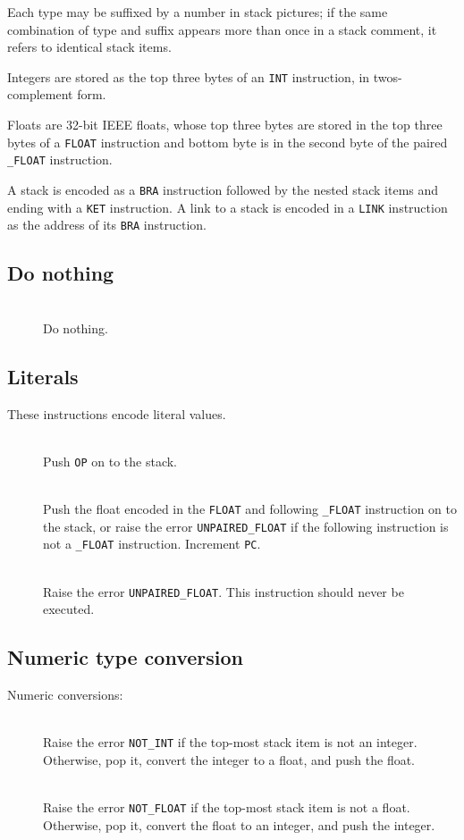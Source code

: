\documentclass[english]{scrartcl}
\newcommand{\spic}[1]{{\spfont\setlength{\baselineskip}{\normalbaselineskip}#1\/}}
\newlength{\itemwidth}\itemwidth=\textwidth \advance\itemwidth by -0.25in
\newlength{\instname}\instname=0.5in
\newlength{\stackcom}\stackcom=\itemwidth \advance\stackcom by -\instname
\newcommand{\inst}[3]{\item[]\parbox{\itemwidth}%
{\makebox[\instname][l]{\tt #1}%
\makebox[\stackcom][r]{\tt ( \spic{#2} )}\\[0.5ex]#3}}
\begin{document}
Each type may be suffixed by a number in stack pictures; if the same combination of type and suffix appears more than once in a stack comment, it refers to identical stack items.

Integers are stored as the top three bytes of an {\tt INT} instruction, in twos-complement form.

Floats are 32-bit IEEE floats, whose top three bytes are stored in the top three bytes of a {\tt FLOAT} instruction and bottom byte is in the second byte of the paired {\tt \_FLOAT} instruction.

A stack is encoded as a {\tt BRA} instruction followed by the nested stack items and ending with a {\tt KET} instruction. A link to a stack is encoded in a {\tt LINK} instruction as the address of its {\tt BRA} instruction.


\subsection{Do nothing}
\label{nopinst}

\begin{description}
\inst{NOP}{--}{Do nothing.}
\end{description}


\subsection{Literals}
\label{literals}

These instructions encode literal values.

\nopagebreak

\begin{description}
  \inst{INT}{-- i}{Push {\tt OP} on to the stack.}
  \inst{FLOAT}{-- f}{Push the float encoded in the {\tt FLOAT} and following {\tt \_FLOAT} instruction on to the stack, or raise the error {\tt UNPAIRED\_FLOAT} if the following instruction is not a {\tt \_FLOAT} instruction. Increment {\tt PC}.}
  \inst{\_FLOAT}{}{Raise the error {\tt UNPAIRED\_FLOAT}. This instruction should never be executed.}
\end{description}


\subsection{Numeric type conversion}

Numeric conversions:

\nopagebreak

\begin{description}
  \inst{I2F}{i -- f}{Raise the error {\tt NOT\_INT} if the top-most stack item is not an integer. Otherwise, pop it, convert the integer to a float, and push the float.}
  \inst{F2I}{f -- i}{Raise the error {\tt NOT\_FLOAT} if the top-most stack item is not a float. Otherwise, pop it, convert the float to an integer, and push the integer.}
\end{description}
\end{document}
